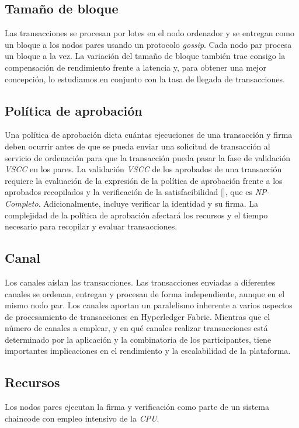 \subsection{Tama\~no de bloque}
Las transacciones se procesan por lotes en el nodo ordenador y se entregan como un bloque a los nodos pares usando un protocolo \emph{gossip}. Cada nodo par procesa un bloque a la vez. La variaci\'on del tama\~no de bloque tambi\'en trae consigo la compensaci\'on de rendimiento frente a latencia y, para obtener una mejor concepci\'on, lo estudiamos en conjunto con la tasa de llegada de transacciones.

\subsection{Pol\'itica de aprobaci\'on}
Una pol\'itica de aprobaci\'on dicta cu\'antas ejecuciones de una transacci\'on y firma deben ocurrir antes de que se pueda enviar una solicitud de transacci\'on al servicio de ordenaci\'on para que la transacci\'on pueda pasar la fase de validaci\'on \emph{VSCC} en los pares. La validaci\'on \emph{VSCC} de los aprobados de una transacci\'on requiere la evaluaci\'on de la expresi\'on de la pol\'itica de aprobaci\'on frente a los aprobados recopilados y la verificaci\'on de la satisfacibilidad [\cite{gottlieb2002evolutionary}], que es \emph{NP-Completo}. Adicionalmente, incluye verificar la identidad y su firma. La complejidad de la pol\'itica de aprobaci\'on afectar\'a los recursos y el tiempo necesario para recopilar y evaluar transacciones.

\subsection{Canal}
Los canales a\'islan las transacciones. Las transacciones enviadas a diferentes canales se ordenan, entregan y procesan de forma independiente, aunque en el mismo nodo par. Los canales aportan un paralelismo inherente a varios aspectos de procesamiento de transacciones en Hyperledger Fabric. Mientras que el n\'umero de canales a emplear, y en qu\'e canales realizar transacciones est\'a determinado por la aplicaci\'on y la combinatoria de los participantes, tiene importantes implicaciones en el rendimiento y la escalabilidad de la plataforma.

\subsection{Recursos}
Los nodos pares ejecutan la firma y verificaci\'on como parte de un sistema chaincode con empleo intensivo de la \emph{CPU}.

